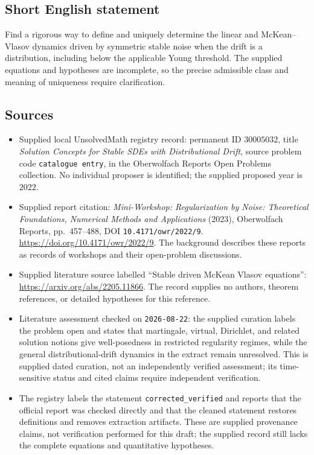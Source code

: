 \documentclass[11pt]{article}
\begin{document}
\subsection{Short English statement}
Find a rigorous way to define and uniquely determine the linear and McKean--Vlasov dynamics driven by symmetric stable noise when the drift is a distribution, including below the applicable Young threshold. The supplied equations and hypotheses are incomplete, so the precise admissible class and meaning of uniqueness require clarification.
\subsection{Sources}
\begin{itemize}
\item Supplied local UnsolvedMath registry record: permanent ID \(30005032\), title \emph{Solution Concepts for Stable SDEs with Distributional Drift}, source problem code \texttt{catalogue entry}, in the Oberwolfach Reports Open Problems collection. No individual proposer is identified; the supplied proposed year is \(2022\).
\item Supplied report citation: \emph{Mini-Workshop: Regularization by Noise: Theoretical Foundations, Numerical Methods and Applications} (2023), Oberwolfach Reports, pp.\ 457--488, DOI \texttt{10.4171/owr/2022/9}. \url{https://doi.org/10.4171/owr/2022/9}. The background describes these reports as records of workshops and their open-problem discussions.
\item Supplied literature source labelled ``Stable driven McKean Vlasov equations'': \url{https://arxiv.org/abs/2205.11866}. The record supplies no authors, theorem references, or detailed hypotheses for this reference.
\item Literature assessment checked on \texttt{2026-08-22}: the supplied curation labels the problem open and states that martingale, virtual, Dirichlet, and related solution notions give well-posedness in restricted regularity regimes, while the general distributional-drift dynamics in the extract remain unresolved. This is supplied dated curation, not an independently verified assessment; its time-sensitive status and cited claims require independent verification.
\item The registry labels the statement \texttt{corrected\_verified} and reports that the official report was checked directly and that the cleaned statement restores definitions and removes extraction artifacts. These are supplied provenance claims, not verification performed for this draft; the supplied record still lacks the complete equations and quantitative hypotheses.
\end{itemize}
\end{document}
